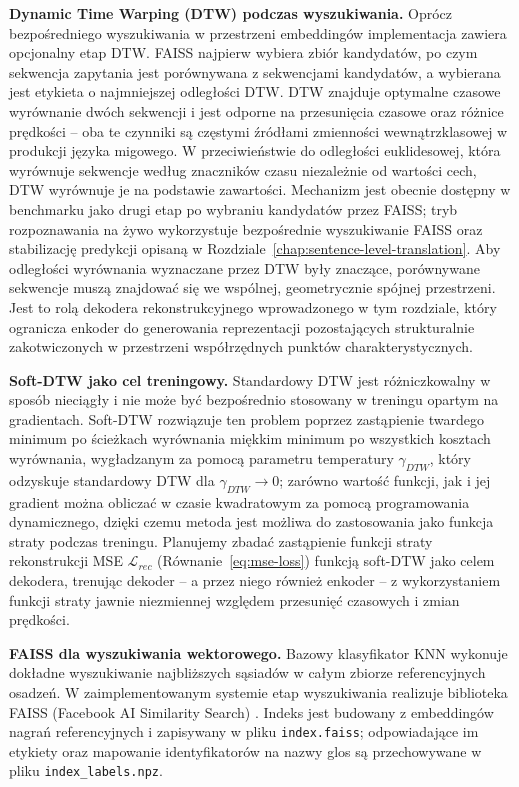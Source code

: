 \textbf{Dynamic Time Warping (DTW) podczas wyszukiwania.} Oprócz
bezpośredniego wyszukiwania w przestrzeni embeddingów implementacja zawiera
opcjonalny etap DTW. FAISS najpierw wybiera zbiór kandydatów, po czym sekwencja
zapytania jest porównywana z sekwencjami kandydatów, a wybierana jest etykieta
o najmniejszej odległości DTW. DTW znajduje optymalne czasowe wyrównanie dwóch
sekwencji i jest odporne na przesunięcia czasowe oraz różnice prędkości -- oba
te czynniki są częstymi źródłami zmienności wewnątrzklasowej w produkcji języka
migowego. W przeciwieństwie do odległości euklidesowej, która wyrównuje
sekwencje według znaczników czasu niezależnie od wartości cech, DTW wyrównuje
je na podstawie zawartości. Mechanizm jest obecnie dostępny w benchmarku jako
drugi etap po wybraniu kandydatów przez FAISS; tryb rozpoznawania na żywo
wykorzystuje bezpośrednie wyszukiwanie FAISS oraz stabilizację predykcji
opisaną w Rozdziale~\ref{chap:sentence-level-translation}. Aby odległości
wyrównania wyznaczane przez DTW były znaczące, porównywane sekwencje muszą
znajdować się we wspólnej, geometrycznie spójnej przestrzeni. Jest to rolą
dekodera rekonstrukcyjnego wprowadzonego w tym rozdziale, który ogranicza
enkoder do generowania reprezentacji pozostających strukturalnie zakotwiczonych
w przestrzeni współrzędnych punktów charakterystycznych.

\textbf{Soft-DTW jako cel treningowy.} Standardowy DTW jest różniczkowalny
w sposób nieciągły i nie może być bezpośrednio stosowany w treningu
opartym na gradientach. Soft-DTW \cite{cuturi2017softdtw} rozwiązuje ten
problem poprzez zastąpienie twardego minimum po ścieżkach wyrównania
miękkim minimum po wszystkich kosztach wyrównania, wygładzanym za pomocą
parametru temperatury $\gamma_{DTW}$, który odzyskuje standardowy DTW
dla $\gamma_{DTW} \to 0$; zarówno wartość funkcji, jak i jej gradient
można obliczać w czasie kwadratowym za pomocą programowania dynamicznego,
dzięki czemu metoda jest możliwa do zastosowania jako funkcja straty
podczas treningu. Planujemy zbadać zastąpienie funkcji straty rekonstrukcji
MSE $\mathcal{L}_{rec}$ (Równanie~\ref{eq:mse-loss}) funkcją soft-DTW jako
celem dekodera, trenując dekoder -- a przez niego również enkoder --
z wykorzystaniem funkcji straty jawnie niezmiennej względem przesunięć
czasowych i zmian prędkości.

\textbf{FAISS dla wyszukiwania wektorowego.} Bazowy klasyfikator KNN wykonuje
dokładne wyszukiwanie najbliższych sąsiadów w całym zbiorze referencyjnych
osadzeń. W zaimplementowanym systemie etap wyszukiwania realizuje biblioteka
FAISS (Facebook AI Similarity Search) \cite{johnson2019faiss}. Indeks jest
budowany z embeddingów nagrań referencyjnych i zapisywany w pliku
\texttt{index.faiss}; odpowiadające im etykiety oraz mapowanie identyfikatorów
na nazwy glos są przechowywane w pliku \texttt{index\_labels.npz}.

